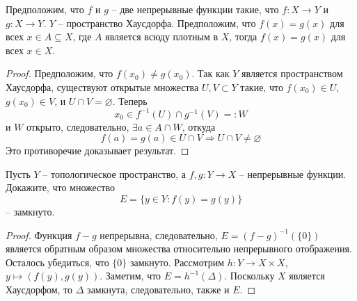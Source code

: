 \begin{statement}
	Предположим, что \( f \) и \( g \) -- две непрерывные функции такие, что \( f : X \rightarrow Y \) и \( g : X \rightarrow Y \). \( Y \) -- пространство Хаусдорфа. Предположим, что \( f(x) = g(x) \) для всех \( x \in A \subseteq X \), где \( A \) является всюду плотным в \( X \), тогда \( f(x) = g(x) \) для всех \( x \in X \).
\end{statement}
\begin{proof}
	Предположим, что \( f(x_0) \neq g(x_0) \). Так как \( Y \) является пространством Хаусдорфа, существуют открытые множества \( U, V \subset Y \) такие, что \( f(x_0) \in U \), \( g(x_0) \in V \), и \( U \cap V = \varnothing \). Теперь
\[ x_0 \in f^{-1}(U) \cap g^{-1}(V) =: W \]
и \( W \) открыто, следовательно, \(\exists a \in A \cap W\), откуда
\[ f(a) = g(a) \in U \cap V \Rightarrow U \cap V \neq \varnothing \]
Это противоречие доказывает результат.
\end{proof}

\begin{statement}
	Пусть \( Y \) -- топологическое пространство, а \( f, g : Y \rightarrow X \) -- непрерывные функции. Докажите, что множество
\[ E = \{ y \in Y : f(y) = g(y) \} \] -- замкнуто.
\end{statement}
\begin{proof}
	Функция \( f - g \) непрерывна, следовательно, \( E = (f - g)^{-1}(\{0\}) \) является обратным образом множества относительно непрерывного отображения. Осталось убедиться, что \(\{0\}\) замкнуто.
 Рассмотрим \( h : Y \rightarrow X \times X \), \( y \mapsto (f(y), g(y)) \). Заметим, что \( E = h^{-1}(\Delta) \). Поскольку \( X \) является Хаусдорфом, то \(\Delta\) замкнута, следовательно, также и \( E \).
\end{proof}

